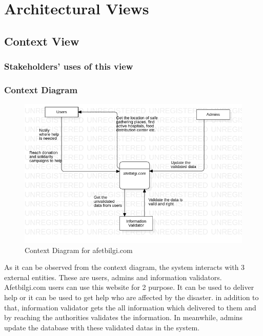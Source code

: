 \chapter{Architectural Views}

\section{Context View}

\subsection{Stakeholders' uses of this view}

\subsection{Context Diagram}

\begin{figure}[H]
    \includegraphics[scale = 0.6]{assets/Context Diagram.png}
    \caption[Context Diagram for afetbilgi.com]{Context Diagram for afetbilgi.com}
\end{figure}

As it can be observed from the context diagram, the system interacts with 3 external entities. These are users, admins and information validators. Afetbilgi.com users can use this website for 2 purpose. It can be used to deliver help or it can be used to get help who are affected by the disaster.
in addition to that, information validator gets the all information which delivered to them and by reaching the authorities validates the information. In meanwhile, admins update the database with these validated datas in the system.

